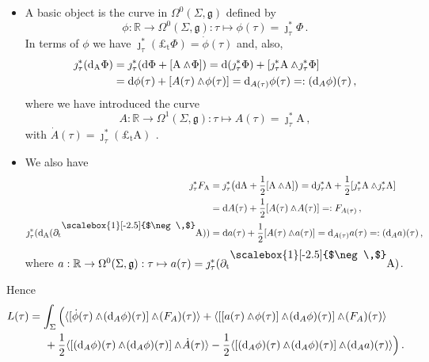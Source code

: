 \documentclass[12pt]{amsart}
\theoremstyle{plain}
\theoremstyle{definition}
\theoremstyle{remark}
\newcommand{\iprod}{\raisebox{8pt}{\scalebox{1}[-2.5]{$\neg\,$}}}
\newcommand{\wed}{\wedge\hspace*{-7.5pt}.\hspace*{3pt}}
\numberwithin{equation}{section}  %
\begin{document}
\begin{itemize}
    \item  A basic object is the curve in $\Omega^0(\Sigma,\mathfrak{g})$ defined by
\[
\phi:\mathbb{R}\rightarrow\Omega^0(\Sigma,\mathfrak{g}):\tau\mapsto\phi(\tau)=\jmath_\tau^* \Phi\,.
\]
In terms of $\phi$ we have $\jmath_\tau^*(\pounds_{\mathrm{t}}\Phi)=\dot{\phi}(\tau)$ and, also,
\begin{align*}
 \jmath_\tau^*(\mathrm{d}_\mathrm{A} \Phi)
& =\jmath_\tau^*(\mathrm{d}\Phi+[\mathrm{A}\wed \Phi])=\mathrm{d}(\jmath_\tau^*\Phi)+[\jmath_\tau^*{\mathrm{A}\wed \jmath_\tau^*\Phi}]\\
&=\mathrm{d}\phi(\tau)+[A(\tau)\wed\phi(\tau)] =\mathrm{d}_{A(\tau)}\phi(\tau)=: (\mathrm{d}_A\phi)(\tau) \,,  
\end{align*}
where we have introduced the curve \[A:\mathbb{R}\rightarrow\Omega^1(\Sigma, \mathfrak{g}):\tau\mapsto A(\tau)=\jmath_\tau^*\mathrm{A}\,,\] with \(\dot{A}(\tau)=\jmath_\tau^*(\pounds_{\mathrm{t}}\mathrm{A})\phantom{\Big)}\).  

\item   We also have
\begin{align*}
\jmath_\tau^* F_\mathrm{A}&=\jmath_\tau^*\big(\mathrm{d} \mathrm{A}+\frac{1}{2}[\mathrm{A}\wed \mathrm{A}]\big)=\mathrm{d}\jmath_\tau^*\mathrm{A}+\frac{1}{2}[\jmath_\tau^*\mathrm{A}\wed\jmath_\tau^*\mathrm{A}]\\
&=\mathrm{d}A(\tau)+\frac{1}{2}[A(\tau)\wed A(\tau)] =:F_{A(\tau)}\,,\\
\jmath_\tau^*(\mathrm{d}_\mathrm{A}(\partial_{\mathrm{t}}\iprod \mathrm{A}))&=\mathrm{d}a(\tau)+\frac{1}{2}[A(\tau)\wed a(\tau)]=\mathrm{d}_{A(\tau)}a(\tau)=:(\mathrm{d}_Aa)(\tau)\,,
\end{align*}
where $a:\mathbb{R}\rightarrow \Omega^0(\Sigma,\mathfrak{g}): \tau\mapsto a(\tau)= \jmath_\tau^*(\partial_{\mathrm{t}}\iprod \mathrm{A})$. 
\end{itemize}
Hence
\begin{align*}
  L(\tau)&=\int_\Sigma \Big(\langle [\dot{\phi}(\tau)\wed (\mathrm{d}_A\phi)(\tau)]\wed (F_A)(\tau)\rangle +\langle [[a(\tau)\wed \phi(\tau)]\wed (\mathrm{d}_A\phi)(\tau)]\wed (F_A)(\tau)\rangle \\
   &\hspace*{5mm}+\frac{1}{2}\langle [(\mathrm{d}_A\phi)(\tau) \wed (\mathrm{d}_A\phi)(\tau)]\wed\dot{A}(\tau)\rangle-\frac{1}{2}\langle  [(\mathrm{d}_A\phi)(\tau) \wed (\mathrm{d}_A\phi)(\tau)]\wed (\mathrm{d}_Aa)(\tau) \rangle\Big)\,.
\end{align*}
\end{document}
